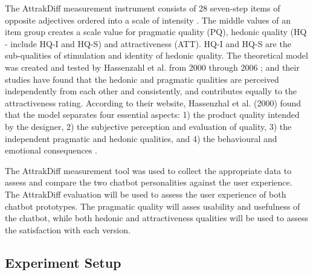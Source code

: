     The AttrakDiff measurement instrument consists of 28 seven-step items of opposite adjectives ordered into a scale of intensity \citep{attrakdiff2013}. The middle values of an item group creates a scale value for pragmatic quality (PQ), hedonic quality (HQ - include HQ-I and HQ-S) and attractiveness (ATT). HQ-I and HQ-S are the sub-qualities of stimulation and identity of hedonic quality. The theoretical model was created and tested by Hassenzahl et al. from 2000 through 2006 \citep{Hassenzahl2000, Hassenzahl2001}; and their studies have found that the hedonic and pragmatic qualities are perceived independently from each other and consistently, and contributes equally to the attractiveness rating. According to their website, Hassenzhal et al. (2000) found that the model separates four essential aspects: 1) the product quality intended by the designer, 2) the subjective perception and evaluation of quality, 3) the independent pragmatic and hedonic qualities, and 4) the behavioural and emotional consequences \citep{attrakdiff2013}.
    
    The AttrakDiff measurement tool was used to collect the appropriate data to assess and compare the two chatbot personalities against the user experience. The AttrakDiff evaluation will be used to assess the user experience of both chatbot prototypes. The pragmatic quality will asses usability and usefulness of the chatbot, while both hedonic and attractiveness qualities will be used to assess the satisfaction with each version.
    
    \subsection{Experiment Setup}
    
